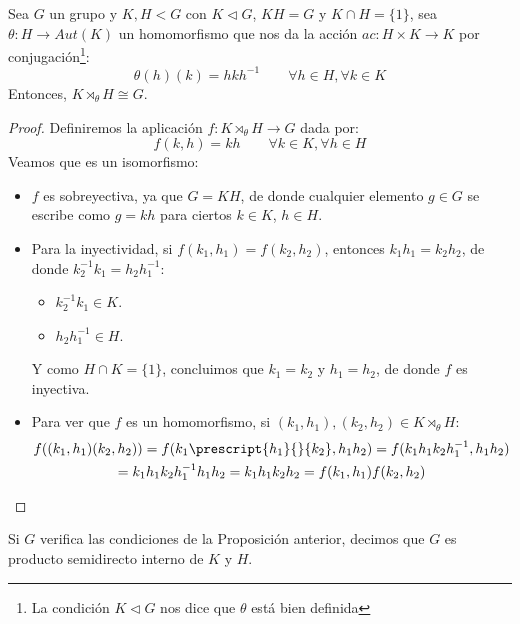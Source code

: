 \begin{teo}
    Sea $G$ un grupo y $K,H<G$ con $K\lhd G$, $KH = G$ y $K\cap H = \{1\}$, sea $\theta:H\to Aut(K)$ un homomorfismo que nos da la acción $ac:H\times K\to K$ por conjugación\footnote{La condición $K\lhd G$ nos dice que $\theta$ está bien definida}:
    \begin{equation*}
        \theta(h)(k) = hkh^{-1} \qquad \forall h\in H,\forall  k\in K
    \end{equation*}
    Entonces, $K\rtimes_\theta H \cong G$.
    \begin{proof}
        Definiremos la aplicación $f:K\rtimes_\theta H \to G$ dada por:
        \begin{equation*}
            f(k,h) = kh \qquad \forall k\in K, \forall h\in H
        \end{equation*}
        Veamos que es un isomorfismo:
        \begin{itemize}
            \item $f$ es sobreyectiva, ya que $G = KH$, de donde cualquier elemento $g\in G$ se escribe como $g = kh$  para ciertos $k\in K$, $h\in H$.
            \item Para la inyectividad, si $f(k_1,h_1) = f(k_2,h_2)$, entonces $k_1h_1 = k_2h_2$, de donde $k_2^{-1}k_1=h_2h_1^{-1}$:
                \begin{itemize}
                    \item $k_2^{-1}k_1\in K$.
                    \item $h_2h_1^{-1}\in H$.
                \end{itemize}
                Y como $H\cap K = \{1\}$, concluimos que $k_1 = k_2$ y $h_1 = h_2$, de donde $f$ es inyectiva.
            \item Para ver que $f$ es un homomorfismo, si $(k_1,h_1),(k_2,h_2)\in K\rtimes_\theta H$:
                \begin{multline*}
                    f((k_1,h_1)(k_2,h_2)) = f(k_1\prescript{h_1}{}{k_2},h_1h_2) = f(k_1h_1k_2h_1^{-1},h_1h_2) \\ = k_1h_1k_2h_1^{-1}h_1h_2 = k_1h_1k_2h_2 = f(k_1,h_1)f(k_2,h_2)
                \end{multline*}
        \end{itemize}
    \end{proof}
\end{teo}

\begin{definicion}
    Si $G$ verifica las condiciones de la Proposición anterior, decimos que $G$ es producto semidirecto interno de $K$ y $H$.
\end{definicion}

